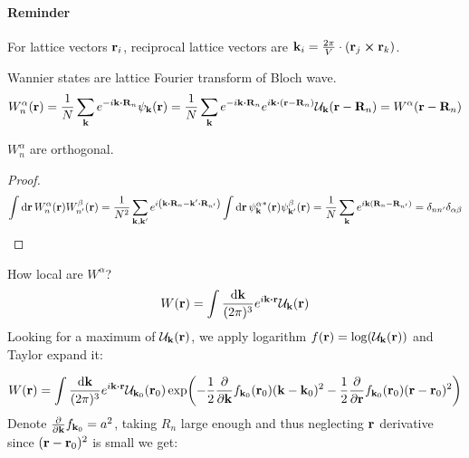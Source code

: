 \paragraph{Reminder}
For lattice vectors $\vb{r}_i$, reciprocal lattice vectors are $\vb{k}_i = \frac{2\pi}{V} \cdot \qty(\vb{r}_j \cross \vb{r}_k)$.

\begin{definition}
	Wannier states are lattice Fourier transform of Bloch wave.
	\begin{align}
	W^\alpha_n(\vb{r}) = \frac{1}{N} \sum_{\vb{k}} e^{-i \vb{k} \vdot \vb{R}_n} \psi_{\vb{k}} (\vb{r}) = \frac{1}{N} \sum_{\vb{k}} e^{-i \vb{k} \vdot \vb{R}_n} e^{i\vb{k} \vdot (\vb{r}-\vb{R}_n)}\mathcal{U}_{\vb{k}} (\vb{r}-\vb{R}_n) = W^\alpha (\vb{r}-\vb{R}_n)
	\end{align}
\end{definition}

\begin{prop}
	$W^\alpha_n$ are orthogonal.
	\begin{proof}
		\begin{align}
		\int \dd{\vb{r}} W^\alpha_n(\vb{r}) W^\beta_{n'}(\vb{r}) = \frac{1}{N^2} \sum_{\vb{k}, \vb{k}'} e^{i\qty(\vb{k} \vdot \vb{R}_n - \vb{k}' \vdot \vb{R}_{n'})} \int \dd{\vb{r}} {\psi^{\alpha}_{\vb{k}}}^* (\vb{r}) \psi^{\beta}_{\vb{k}'} (\vb{r}) = \frac{1}{N} \sum_{\vb{k}} e^{i \vb{k}(\vb{R}_n - \vb{R}_{n'})} =\delta_{nn'} \delta_{\alpha \beta}
		\end{align}
	\end{proof}
\end{prop}

How local are $W^\alpha$?
\begin{align}
W(\vb{r}) = \int \frac{\dd{\vb{k}}}{(2\pi)^3} e^{i\vb{k} \vdot \vb{r}} \mathcal{U}_{\vb{k}}(\vb{r})
\end{align}
Looking for a maximum of $\mathcal{U}_{\vb{k}}(\vb{r})$, we apply logarithm $f(\vb{r}) = \log(\mathcal{U}_{\vb{k}}(\vb{r}))$ and Taylor expand it:

\begin{align}
W(\vb{r}) = \int \frac{\dd{\vb{k}}}{(2\pi)^3} e^{i\vb{k} \vdot \vb{r}} \mathcal{U}_{\vb{k}_0}(\vb{r}_0) \exp(-\frac{1}{2} \pdv{\vb{k}} f_{\vb{k}_0} (\vb{r}_0) (\vb{k} - \vb{k}_0)^2 -\frac{1}{2} \pdv{\vb{r}} f_{\vb{k}_0} (\vb{r}_0) (\vb{r} - \vb{r}_0)^2)
\end{align}
Denote $\pdv{\vb{k}} f_{\vb{k}_0}  = a^2$, taking $R_n$ large enough and thus neglecting $\vb{r}$ derivative since $(\vb{r} - \vb{r}_0)^2$ is small we get:


